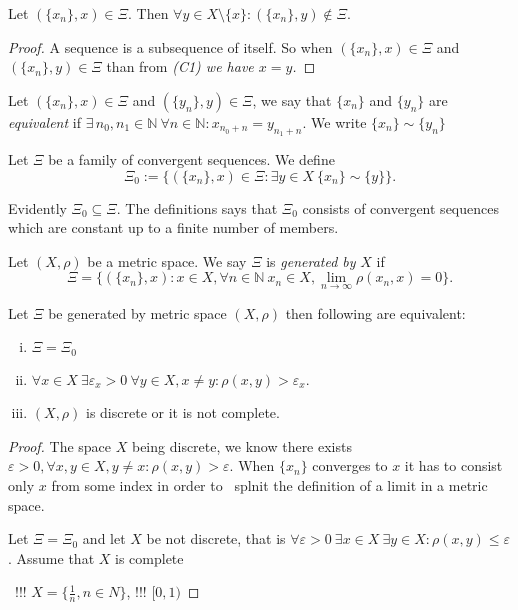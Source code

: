 \begin{theorem} \label{th:onelim}
Let $(\{x_n\},x)\in\Xi$. Then $\forall y\in X\setminus\{x\}: (\{x_n\},y)\notin\Xi$.
\end{theorem} 
\begin{proof} 
	A sequence is a subsequence of itself. So when $(\{x_n\},x)\in\Xi$ and $(\{x_n\},y)\in\Xi$ than from \sl{(C1)} we have $x=y$.
\end{proof}

\begin{define}\label{def:ekv}
Let $(\{x_n\},x)\in\Xi$ and $(\{y_n\},y)\in\Xi$, we say that $\{x_n\}$ and $\{y_n\}$ are {\sl equivalent} if $\exists\, n_0, n_1 \in \mathbb{N}\ \forall n \in \mathbb{N}: x_{n_0+n}=y_{n_1+n}$. We write $\{x_n\} \sim \{y_n\}$
\end{define}

\begin{define}\label{def:xi0}
Let $\Xi$ be a family of convergent sequences. We define
\[
	\Xi_0:=\{(\{x_n\},x)\in\Xi : \exists y\in X\ \{x_n\} \sim \{y\}\}.
\]
\end{define}
Evidently $\Xi_0\subseteq \Xi$. The definitions says that $\Xi_0$ consists of convergent sequences which are constant up to a finite number of members. 

\begin{define}\label{def:gen}
Let $(X,\rho)$ be a metric space. We say $\Xi$ is {\sl generated by} $X$ if 
\[
	\Xi=\{(\{x_n\},x): x\in X, \forall n\in \mathbb{N}\ x_n\in X, \lim_{n \to \infty} \rho(x_n,x)=0\}.
\]
\end{define}

\begin{theorem} \label{th:xieqxi0}
Let $\Xi$ be generated by metric space $(X,\rho)$ then following are equivalent:
\begin{enumerate}[(i)]
	\item $\Xi=\Xi_0$
	\item $\forall x\in X\ \exists \varepsilon_x>0\ \forall y\in X, x\neq y: \rho(x,y)>\varepsilon_x$.
	\item $(X,\rho)$ is discrete or it  is not complete.
\end{enumerate}
\end{theorem} 

\begin{proof}
	The space $X$ being discrete, we know there exists $\varepsilon >0, \forall x,y\in X, y\neq x: \rho(x,y)>\varepsilon$.
	When $\{x_n\}$ converges to $x$ it has to consist only $x$ from some index in order to \tbd\ splnit the definition of a limit in a metric space.
	
	Let $\Xi=\Xi_0$ and let $X$ be not discrete, that is $\forall \varepsilon>0\ \exists x\in X\ \exists y\in X: \rho(x,y)\leq \varepsilon$. Assume that $X$ is complete

\tbd\ !!! $X=\{\frac{1}{n}, n\in N\}$, !!! $[0,1)$
\end{proof}

